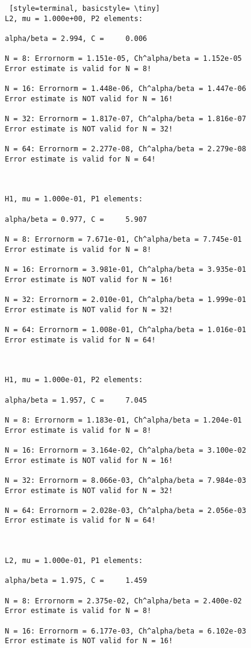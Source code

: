 \documentclass[a4paper,english,12pt,twoside]{article}
\begin{document}
\begin{lstlisting} [style=terminal, basicstyle= \tiny]
L2, mu = 1.000e+00, P2 elements:

alpha/beta = 2.994, C =     0.006

N = 8: Errornorm = 1.151e-05, Ch^alpha/beta = 1.152e-05
Error estimate is valid for N = 8!

N = 16: Errornorm = 1.448e-06, Ch^alpha/beta = 1.447e-06
Error estimate is NOT valid for N = 16!

N = 32: Errornorm = 1.817e-07, Ch^alpha/beta = 1.816e-07
Error estimate is NOT valid for N = 32!

N = 64: Errornorm = 2.277e-08, Ch^alpha/beta = 2.279e-08
Error estimate is valid for N = 64!



H1, mu = 1.000e-01, P1 elements:

alpha/beta = 0.977, C =     5.907

N = 8: Errornorm = 7.671e-01, Ch^alpha/beta = 7.745e-01
Error estimate is valid for N = 8!

N = 16: Errornorm = 3.981e-01, Ch^alpha/beta = 3.935e-01
Error estimate is NOT valid for N = 16!

N = 32: Errornorm = 2.010e-01, Ch^alpha/beta = 1.999e-01
Error estimate is NOT valid for N = 32!

N = 64: Errornorm = 1.008e-01, Ch^alpha/beta = 1.016e-01
Error estimate is valid for N = 64!



H1, mu = 1.000e-01, P2 elements:

alpha/beta = 1.957, C =     7.045

N = 8: Errornorm = 1.183e-01, Ch^alpha/beta = 1.204e-01
Error estimate is valid for N = 8!

N = 16: Errornorm = 3.164e-02, Ch^alpha/beta = 3.100e-02
Error estimate is NOT valid for N = 16!

N = 32: Errornorm = 8.066e-03, Ch^alpha/beta = 7.984e-03
Error estimate is NOT valid for N = 32!

N = 64: Errornorm = 2.028e-03, Ch^alpha/beta = 2.056e-03
Error estimate is valid for N = 64!



L2, mu = 1.000e-01, P1 elements:

alpha/beta = 1.975, C =     1.459

N = 8: Errornorm = 2.375e-02, Ch^alpha/beta = 2.400e-02
Error estimate is valid for N = 8!

N = 16: Errornorm = 6.177e-03, Ch^alpha/beta = 6.102e-03
Error estimate is NOT valid for N = 16!


\end{lstlisting}
\end{document}
